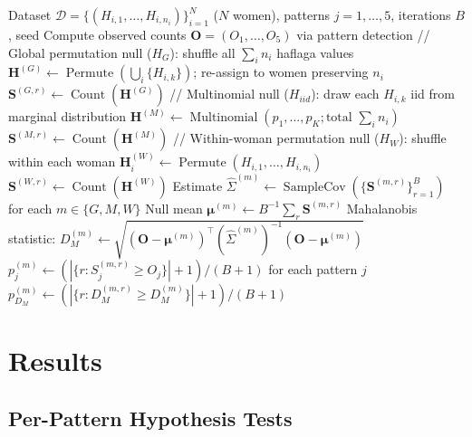 \documentclass[12pt]{article}
\begin{document}
\begin{algorithm}[H]
\caption{Full simulation pipeline}
\label{alg:sim}
\begin{algorithmic}[1]
\Require Dataset $\mathcal{D} = \{(H_{i,1},\ldots,H_{i,n_i})\}_{i=1}^{N}$ ($N$ women),
         patterns $j = 1,\ldots,5$, iterations $B$, seed
\State Compute observed counts $\mathbf{O} = (O_1,\ldots,O_5)$ via pattern detection
  \State // Global permutation null ($H_G$): shuffle all $\sum_i n_i$ haflaga values
  \State $\mathbf{H}^{(G)} \leftarrow \operatorname{Permute}(\bigcup_i \{H_{i,k}\})$;
         re-assign to women preserving $n_i$
  \State $\mathbf{S}^{(G,r)} \leftarrow \operatorname{Count}(\mathbf{H}^{(G)})$
  \State // Multinomial null ($H_{iid}$): draw each $H_{i,k}$ iid from marginal distribution
  \State $\mathbf{H}^{(M)} \leftarrow \operatorname{Multinomial}(p_1,\ldots,p_K; \text{total } \textstyle\sum_i n_i)$
  \State $\mathbf{S}^{(M,r)} \leftarrow \operatorname{Count}(\mathbf{H}^{(M)})$
  \State // Within-woman permutation null ($H_W$): shuffle within each woman
    \State $\mathbf{H}^{(W)}_i \leftarrow \operatorname{Permute}(H_{i,1},\ldots,H_{i,n_i})$
  \EndFor
  \State $\mathbf{S}^{(W,r)} \leftarrow \operatorname{Count}(\mathbf{H}^{(W)})$
\EndFor
\State Estimate $\hat{\Sigma}^{(m)} \leftarrow \operatorname{SampleCov}(\{\mathbf{S}^{(m,r)}\}_{r=1}^{B})$
       for each $m \in \{G, M, W\}$
  \State Null mean $\boldsymbol{\mu}^{(m)} \leftarrow B^{-1}\sum_r \mathbf{S}^{(m,r)}$
  \State Mahalanobis statistic:
         $D_M^{(m)} \leftarrow \sqrt{(\mathbf{O}-\boldsymbol{\mu}^{(m)})^\top
         (\hat{\Sigma}^{(m)})^{-1}(\mathbf{O}-\boldsymbol{\mu}^{(m)})}$
  \State $p_j^{(m)} \leftarrow (|\{r : S_j^{(m,r)} \geq O_j\}|+1)/(B+1)$
         for each pattern $j$ 
  \State $p_{D_M}^{(m)} \leftarrow (|\{r : D_M^{(m,r)} \geq D_M^{(m)}\}|+1)/(B+1)$
\EndFor
\end{algorithmic}
\end{algorithm}

\section{Results}

\subsection{Per-Pattern Hypothesis Tests}
\end{document}
